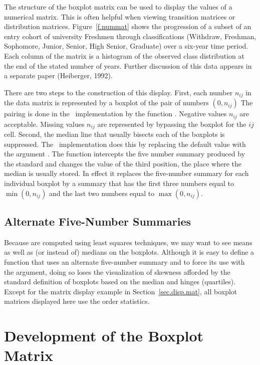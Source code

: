 The structure of the boxplot matrix can be used to display the values of a
numerical matrix.  This is often helpful when viewing transition matrices
or distribution matrices.
Figure~\ref{f.nummat} shows the progression of a subset of
an entry cohort of university Freshmen through classifications (Withdraw,
Freshman, Sophomore, Junior, Senior, High Senior, Graduate) over a six-year
time period.  Each column of the matrix is a histogram of the observed class
distribution at the end of the stated number of years.	Further discussion of
this data appears in a separate paper (Heiberger, 1992).

There are two steps to the construction of this display.  First,
each number $n_{ij}$ in the data matrix is represented by a
boxplot of the pair of numbers $(0,n_{ij})$  The pairing is done
in the \iS\ implementation by the function .
Negative values $n_{ij}$ are acceptable.  Missing values $n_{ij}$
are represented by bypassing the boxplot for the $ij$ cell.
Second, the median line that usually bisects each of the boxplots is
suppressed.  The \iS\ implementation does this by replacing the
default value  with the argument
.  The function  intercepts the five
number summary produced by the standard  and changes
the value of the third position, the place where the median is
usually stored.  In effect it replaces the five-number summary
for each individual boxplot by a summary that has the first three
numbers equal to $\min(0,n_{ij})$ and the last two numbers equal
to $\max(0,n_{ij})$.


\subsection{Alternate Five-Number Summaries}

Because  are computed using least squares techniques, we
may want to see means as well as (or instead of) medians on the
boxplots.  Although it is easy to define a function that uses an
alternate five-number summary and to force its use with the
 argument, doing so loses the visualization of skewness
afforded by the standard definition of boxplots based on the
median and hinges (quartiles).	Except for the matrix
display example in Section~\ref{sec.disp.mat}, all boxplot
matrices displayed here use the order statistics.


\section{Development of the Boxplot Matrix}
\label{sec-dev}


